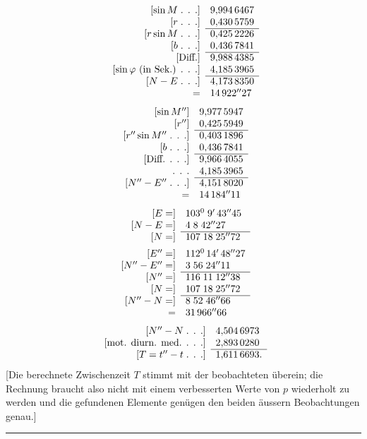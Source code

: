\clearpage
{}
\[
\begin{array}{rl}
{}[\sin M\;\text{. . .}]&9{,}994\,6467\\
{}[r\;\text{. . .}]&0{,}430\,5759\\\cline{2-2}
{}[r\sin M\;\text{. . .}]&0{,}425\,2226\\
{}[b\;\text{. . .}]&0{,}436\,7841\\\cline{2-2}
{}[\text{Diff.}]&9{,}988\,4385\\
{}[\sin\varphi\text{ (in Sek.) . . .}]&4{,}185\,3965\\\cline{2-2}
{}[N-E\;\text{. . .}]&4{,}173\,8350\\
=&14\,922''27
\end{array}
\]
\[
\begin{array}{rl}
{}[\sin M'']&9{,}977\,5947\\
{}[r'']&0{,}425\,5949\\\cline{2-2}
{}[r''\sin M''\;\text{. . .}]&0{,}403\,1896\\
{}[b\;\text{. . .}]&0{,}436\,7841\\\cline{2-2}
{}[\text{Diff. . . .}]&9{,}966\,4055\\
\text{. . .}&4{,}185\,3965\\\cline{2-2}
{}[N''-E''\;\text{. . .}]&4{,}151\,8020\\
=&14\,184''11
\end{array}
\]
\[
\begin{array}{rl}
{}[E=]&103^0\;9'\,43''45\\
{}[N-E=]&4\;8\;42''27\\\cline{2-2}
{}[N=]&107\;18\;25''72\\[5pt]
{}[E''=]&112^0\,14'\,48''27\\
{}[N''-E''=]&3\;56\;24''11\\\cline{2-2}
{}[N''=]&116\;11\;12''38\\
{}[N=]&107\;18\;25''72\\\cline{2-2}
{}[N''-N=]&8\;52\;46''66\\
=&31\,966''66
\end{array}
\]
\[
\begin{array}{rl}
{}[N''-N\;\text{. . .}]&4{,}504\,6973\\
{}[\text{mot. diurn. med. . . .}]&2{,}893\,0280\\\cline{2-2}
{}[T=t''-t\;\text{. . .}]&1{,}611\,6693.
\end{array}
\]
\noindent\hspace*{\parindent}[Die berechnete Zwischenzeit $T$ stimmt mit der beobachteten überein; die Rechnung braucht also nicht mit einem verbesserten Werte von $p$ wiederholt zu werden und die gefundenen Elemente genügen den beiden äussern Beobachtungen genau.]
\begin{center}\rule{.20\linewidth}{.3pt}\end{center}
\clearpage
\endgroup
